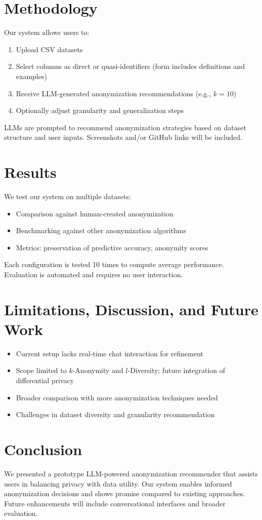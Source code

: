 \documentclass{article}
\begin{document}
\section{Methodology}
Our system allows users to:
\begin{enumerate}
    \item Upload CSV datasets
    \item Select columns as direct or quasi-identifiers (form includes definitions and examples)
    \item Receive LLM-generated anonymization recommendations (e.g., $k=10$)
    \item Optionally adjust granularity and generalization steps
\end{enumerate}
LLMs are prompted to recommend anonymization strategies based on dataset structure and user inputs. Screenshots and/or GitHub links will be included.


\section{Results}
We test our system on multiple datasets:
\begin{itemize}
    \item Comparison against human-created anonymization
    \item Benchmarking against other anonymization algorithms
    \item Metrics: preservation of predictive accuracy, anonymity scores
\end{itemize}
Each configuration is tested 10 times to compute average performance. Evaluation is automated and requires no user interaction.

\section{Limitations, Discussion, and Future Work}
\begin{itemize}
    \item Current setup lacks real-time chat interaction for refinement
    \item Scope limited to $k$-Anonymity and $l$-Diversity; future integration of differential privacy
    \item Broader comparison with more anonymization techniques needed
    \item Challenges in dataset diversity and granularity recommendation
\end{itemize}

\section{Conclusion}
We presented a prototype LLM-powered anonymization recommender that assists users in balancing privacy with data utility. Our system enables informed anonymization decisions and shows promise compared to existing approaches. Future enhancements will include conversational interfaces and broader evaluation.
\end{document}

